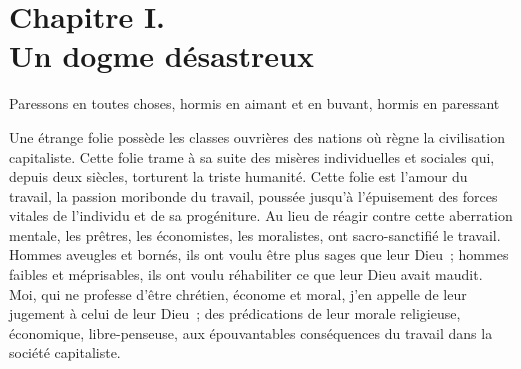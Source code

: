 \documentclass[french,twoside]{book} %
\newcommand{\bibl}[1]{{\RaggedLeft{#1}\par\bigskip}}
\newcommand\chapteropen{} %
\newcommand\chaptercont{} %
\begin{document}
\chapteropen
\chapter[Chapitre I. Un dogme désastreux]{Chapitre I. \\
Un dogme désastreux}\renewcommand{\leftmark}{Chapitre I. \\
Un dogme désastreux}

\noindent Paressons en toutes choses, hormis en aimant et en buvant, hormis en paressant\par

\bibl{Lessing.}

\chaptercont
\noindent Une étrange folie possède les classes ouvrières des nations où règne la civilisation capitaliste. Cette folie trame à sa suite des misères individuelles et sociales qui, depuis deux siècles, torturent la triste humanité. Cette folie est l’amour du travail, la passion moribonde du travail, poussée jusqu’à l’épuisement des forces vitales de l’individu et de sa progéniture. Au lieu de réagir contre cette aberration mentale, les prêtres, les économistes, les moralistes, ont sacro-sanctifié le travail. Hommes aveugles et bornés, ils ont voulu être plus sages que leur Dieu ; hommes faibles et méprisables, ils ont voulu réhabiliter ce que leur Dieu avait maudit. Moi, qui ne professe d’être chrétien, économe et moral, j’en appelle de leur jugement à celui de leur Dieu ; des prédications de leur morale religieuse, économique, libre-penseuse, aux épouvantables conséquences du travail dans la société capitaliste.\par
\end{document}
